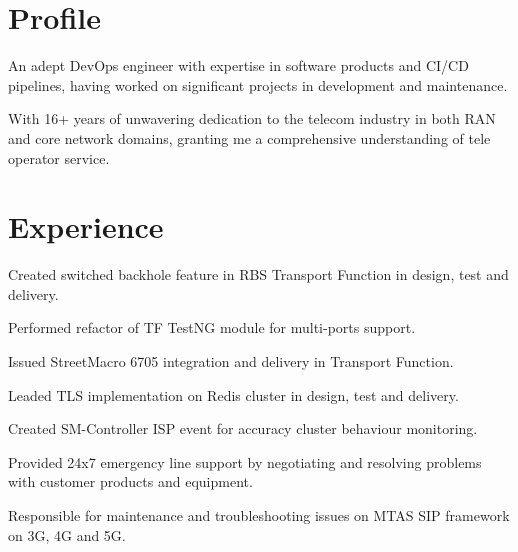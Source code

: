 \documentclass[]{plushcv}
\begin{document}
\begin{minipage}[t]{0.70\textwidth} 



\section{Profile}
An adept DevOps engineer with expertise in software products and CI/CD pipelines, having worked on significant projects in development and maintenance.

With 16+ years of unwavering dedication to the telecom industry in both RAN and core network domains, granting me a comprehensive understanding of tele operator service.
\sectionsep


\section{Experience}
\vspace{\topsep} %
\begin{tightemize}
\sectionsep
\item Created switched backhole feature in RBS Transport Function in design, test and delivery.
\item Performed refactor of TF TestNG module for multi-ports support.
\item Issued StreetMacro 6705 integration and delivery in Transport Function.
\end{tightemize}
\sectionsep

\begin{tightemize}
\sectionsep
\item Leaded TLS implementation on Redis cluster in design, test and delivery.
\item Created SM-Controller ISP event for accuracy cluster behaviour monitoring.
\end{tightemize}
\sectionsep

\begin{tightemize}
\sectionsep
\item Provided 24x7 emergency line support by negotiating and resolving problems with customer products
and equipment.
\item Responsible for maintenance and troubleshooting issues on MTAS SIP framework on 3G, 4G and 5G.
\end{tightemize}
\sectionsep


\end{minipage}
\end{document}
